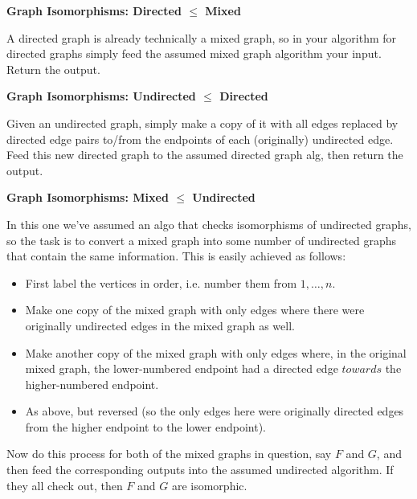 \documentclass[12pt]{article}
\providecommand{\reducible}[2]{
  \textbf{#1} $\leq$ \textbf{#2}
}
\begin{document}
\begin{centering}\textbf{Graph Isomorphisms: \reducible{Directed}{Mixed}}\par\end{centering}
A directed graph is already technically a mixed graph,
so in your algorithm for directed graphs simply feed the assumed mixed graph algorithm your input.
Return the output.


\begin{centering}\textbf{Graph Isomorphisms: \reducible{Undirected}{Directed}}\par\end{centering}
Given an undirected graph, simply make a copy of it with all edges replaced by
directed edge pairs to/from the endpoints of each (originally) undirected edge.
Feed this new directed graph to the assumed directed graph alg, then return the output.

\begin{centering}\textbf{Graph Isomorphisms: \reducible{Mixed}{Undirected}}\par\end{centering}
In this one we've assumed an algo that checks isomorphisms of undirected graphs,
so the task is to convert a mixed graph into some number of undirected graphs that contain the same information.
This is easily achieved as follows:
\begin{itemize}
  \item First label the vertices in order, i.e. number them from $1,\dots,n$.
  \item Make one copy of the mixed graph with only edges where there were originally undirected edges in the mixed graph as well.
  \item Make another copy of the mixed graph with only edges where, in the original mixed graph, the lower-numbered endpoint had a directed edge $towards$ the higher-numbered endpoint.
  \item As above, but reversed (so the only edges here were originally directed edges from the higher endpoint to the lower endpoint).
\end{itemize}
Now do this process for both of the mixed graphs in question, say $F$ and $G$, and then feed the corresponding outputs into the assumed undirected algorithm. If they all check out, then $F$ and $G$ are isomorphic.
\end{document}
